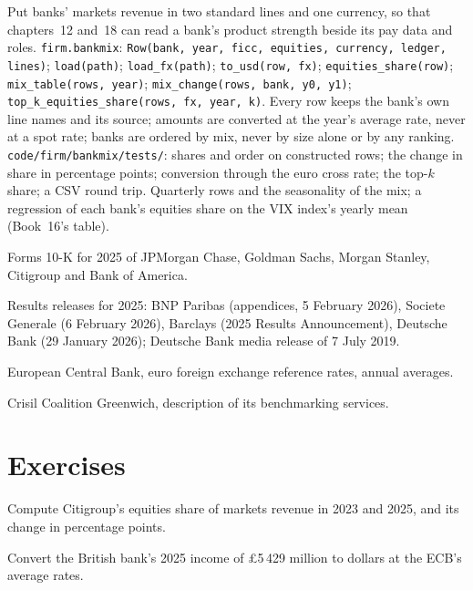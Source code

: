 \begin{build}
 Put banks' markets revenue in two standard lines and one currency, so that chapters~12 and~18 can read a
bank's product strength beside its pay data and roles.
 \texttt{firm.bankmix}: \texttt{Row(bank, year, ficc, equities, currency, ledger, lines)};
\texttt{load(path)}; \texttt{load\_fx(path)}; \texttt{to\_usd(row, fx)}; \texttt{equities\_share(row)};
\texttt{mix\_table(rows, year)}; \texttt{mix\_change(rows, bank, y0, y1)}; \texttt{top\_k\_equities\_share(rows, fx, year, k)}.
 Every row keeps the bank's own line names and its source; amounts are converted at the year's average
rate, never at a spot rate; banks are ordered by mix, never by size alone or by any ranking.
 \texttt{code/firm/bankmix/tests/}: shares and order on constructed rows; the change in share in
percentage points; conversion through the euro cross rate; the top-$k$ share; a CSV round trip.
 Quarterly rows and the seasonality of the mix; a regression of each bank's equities share on the VIX
index's yearly mean (Book~16's table).
\end{build}

\begin{omsources}
\item Forms 10-K for 2025 of JPMorgan Chase, Goldman Sachs, Morgan Stanley, Citigroup and Bank of America.
\item Results releases for 2025: BNP Paribas (appendices, 5 February 2026), Societe Generale (6 February 2026), Barclays
(2025 Results Announcement), Deutsche Bank (29 January 2026); Deutsche Bank media release of 7 July 2019.
\item European Central Bank, euro foreign exchange reference rates, annual averages.
\item Crisil Coalition Greenwich, description of its benchmarking services.
\end{omsources}

\section{Exercises}

\begin{exercise}[$\star$]\label{exo:in:bank-markets-divisions:1}
Compute Citigroup's equities share of markets revenue in 2023 and 2025, and its change in percentage points.
\end{exercise}

\begin{exercise}[$\star$]\label{exo:in:bank-markets-divisions:2}
Convert the British bank's 2025  income of \pounds5\,429 million to dollars at the ECB's average rates.
\end{exercise}

